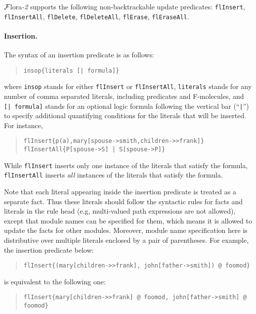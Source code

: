 \documentclass[11pt]{article}
\newcommand{\FLORA}{{\mbox{${\cal F}${\sc lora}\rm\emph{-2}}}\xspace}
\begin{document}
\FLORA supports the following non-backtrackable update predicates:
{\tt flInsert}, {\tt flInsertAll}, {\tt flDelete}, {\tt flDeleteAll},
{\tt flErase}, {\tt flEraseAll}.

%
\paragraph{Insertion.} The syntax of an insertion predicate is as follows:
\begin{quote}
\begin{verbatim}
insop{literals [| formula]}
\end{verbatim}
\end{quote}
where {\tt insop} stands for either {\tt flInsert} or {\tt flInsertAll},
{\tt literals} stands for any number of comma separated literals,
including predicates and \mbox{F-molecules}, and {\tt [| formula]}
stands for an optional logic formula following the vertical bar
(``{\tt |}'') to specify additional quantifying conditions for the
literals that will be inserted. For instance,
\begin{quote}
\begin{verbatim}
flInsert{p(a),mary[spouse->smith,children->>frank]}
flInsertAll{P[spouse->S] | S[spouse->P]}
\end{verbatim}
\end{quote}

While {\tt flInsert} inserts only one instance of the literals that
satisfy the formula, {\tt flInsertAll} inserts \emph{all} instances
of the literals that satisfy the formula.

Note that each literal appearing inside the insertion predicate is
treated as a separate fact. Thus these literals should follow the
syntactic rules for facts and literals in the rule head (e.g,
multi-valued path expressions are not allowed), except that module
names can be specified for them, which means it is allowed to update
the facts for other modules. Moreover, module name specification here
is distributive over multiple literals enclosed by a pair of
parentheses. For example, the insertion predicate below:
\begin{quote}
\begin{verbatim}
flInsert{(mary[children->>frank], john[father->smith]) @ foomod}
\end{verbatim}
\end{quote}
is equivalent to the following one:
\begin{quote}
\verb|flInsert{mary[children->>frank] @ foomod, john[father->smith] @ foomod}|
\end{quote}
\end{document}
